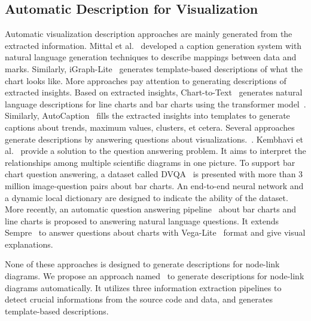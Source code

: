 \subsection{Automatic Description for Visualization}
Automatic visualization description approaches are mainly generated from the extracted information. 
Mittal et al.~\cite{DBLP:journals/coling/MittalMCR98} developed a caption generation system with natural language generation techniques to describe mappings between data and marks.
Similarly, iGraph-Lite~\cite{DBLP:journals/tochi/FerresLST13} generates template-based descriptions of what the chart looks like.
More approaches pay attention to generating descriptions of extracted insights.
Based on extracted insights, Chart-to-Text~\cite{DBLP:conf/inlg/ObeidH20} generates natural language descriptions for line charts and bar charts using the transformer model~\cite{DBLP:conf/nips/VaswaniSPUJGKP17}. 
Similarly, AutoCaption~\cite{DBLP:conf/apvis/LiuXHWY20} fills the extracted insights into templates to generate captions about trends, maximum values, clusters, et cetera. 
Several approaches generate descriptions by answering questions about visualizations.~\cite{DBLP:conf/cvpr/KaflePCK18, DBLP:conf/chi/KimHA20, DBLP:conf/eccv/KembhaviSKSHF16}.
Kembhavi et al.~\cite{DBLP:conf/eccv/KembhaviSKSHF16} provide a solution to the question answering problem. 
It aims to interpret the relationships among multiple scientific diagrams in one picture. 
To support bar chart question answering, a dataset called DVQA~\cite{DBLP:conf/cvpr/KaflePCK18} is presented with more than 3 million image-question pairs about bar charts. 
An end-to-end neural network and a dynamic local dictionary are designed to indicate the ability of the dataset.
More recently, an automatic question answering pipeline~\cite{DBLP:conf/chi/KimHA20} about bar charts and line charts is proposed to answering natural language questions. It extends Sempre~\cite{DBLP:conf/acl/PasupatL15, DBLP:conf/emnlp/ZhangPL17} to answer questions about charts with Vega-Lite~\cite{DBLP:journals/tvcg/SatyanarayanMWH17} format and give visual explanations.

None of these approaches is designed to generate descriptions for node-link diagrams. 
We propose an approach named \ApproachName~to generate descriptions for node-link diagrams automatically.
It utilizes three information extraction pipelines to detect crucial informations from the source code and data,
and generates template-based descriptions.